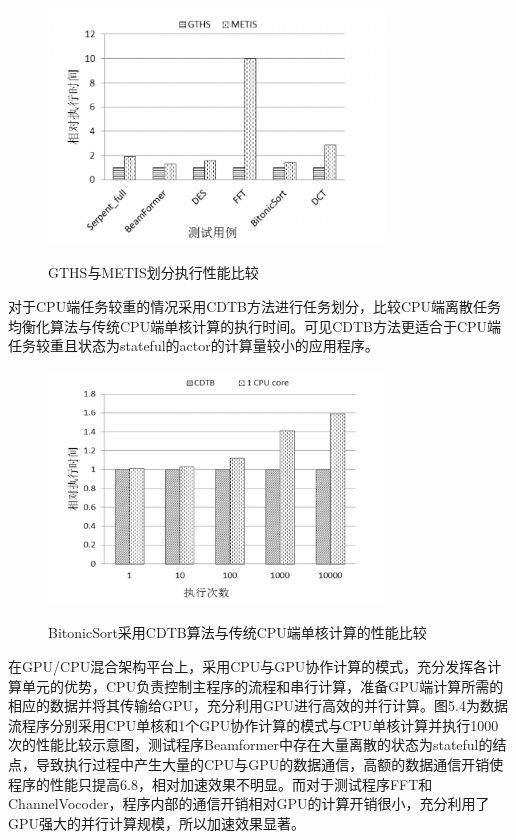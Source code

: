 \begin{figure}[htbp]
  \centering
  \includegraphics[width=0.8\textwidth]{Img/Chap_Application/Yu/gths-metis.png}\\
  \caption{GTHS与METIS划分执行性能比较}\label{fig:gths-metis}
\end{figure}

对于CPU端任务较重的情况采用CDTB方法进行任务划分，比较CPU端离散任务均衡化算法与传统CPU端单核计算的执行时间。可见CDTB方法更适合于CPU端任务较重且状态为stateful的actor的计算量较小的应用程序。

\begin{figure}[htbp]
  \centering
  \includegraphics[width=0.8\textwidth]{Img/Chap_Application/Yu/bitonicsort.png}\\
  \caption{BitonicSort采用CDTB算法与传统CPU端单核计算的性能比较}\label{fig:bitonicsort}
\end{figure}

在GPU/CPU混合架构平台上，采用CPU与GPU协作计算的模式，充分发挥各计算单元的优势，CPU负责控制主程序的流程和串行计算，准备GPU端计算所需的相应的数据并将其传输给GPU，充分利用GPU进行高效的并行计算。图5.4为数据流程序分别采用CPU单核和1个GPU协作计算的模式与CPU单核计算并执行1000次的性能比较示意图，测试程序Beamformer中存在大量离散的状态为stateful的结点，导致执行过程中产生大量的CPU与GPU的数据通信，高额的数据通信开销使程序的性能只提高6.8，相对加速效果不明显。而对于测试程序FFT和ChannelVocoder，程序内部的通信开销相对GPU的计算开销很小，充分利用了GPU强大的并行计算规模，所以加速效果显著。

